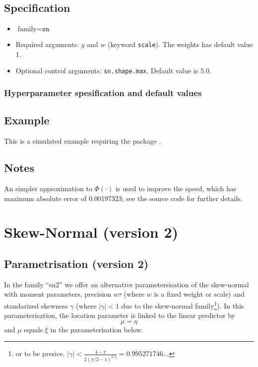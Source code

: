 \documentclass[a4paper,11pt]{article}
\begin{document}
\subsection*{Specification}

\begin{itemize}
\item $\text{family}=\texttt{sn}$
\item Required arguments: $y$ and $w$ (keyword \texttt{scale}). The
    weights has default value 1.
\item Optional control arguments: \texttt{sn.shape.max}. Default value is
    $5.0$.
\end{itemize}

\subsubsection*{Hyperparameter spesification and default values}




\subsection*{Example}

This is a simulated example requiring the package \verb@sn@.


\subsection*{Notes}

An simpler approximation to $\Phi(\cdot)$ is used to improve the
speed, which has maximum absolute error of 0.00197323; see the source
code for further details.

\clearpage


\section*{Skew-Normal (version 2)}

\subsection*{Parametrisation (version 2)}

In the family ``sn2'' we offer an alternative parametersisation of the
skew-normal with moment parameters, precision $w\tau$
(where $w$ is a fixed weight or scale) and standarized skewness
$\gamma$ (where $|\gamma|<1$
due to the skew-normal family\footnote{%
    or to be presice,
    $|\gamma| < \frac{4-\pi}{2\left(\pi/2-1\right)^{3/2}} =
    0.995271746\ldots$}). In this parameterisation, the location
parameter is linked to the linear predictor by
\begin{displaymath}
    \mu = \eta
\end{displaymath}
and $\mu$ equals $\xi$ in the parameterisation below.
\end{document}
